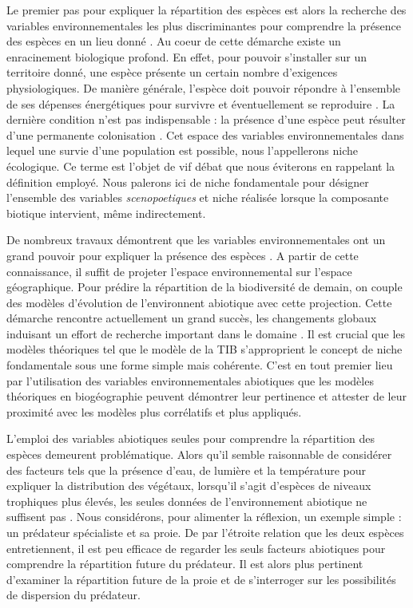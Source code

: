 Le premier pas pour expliquer la répartition des espèces est alors la
recherche des variables environnementales les plus discriminantes pour
comprendre la présence des espèces en un lieu donné \cite{Kearney2004}.
Au coeur de cette démarche existe un enracinement biologique profond. En
effet, pour pouvoir s'installer sur un territoire donné, une espèce
présente un certain nombre d'exigences physiologiques. De manière
générale, l'espèce doit pouvoir répondre à l'ensemble de ses dépenses
énergétiques pour survivre et éventuellement se reproduire
\cite{Holt2009a}. La dernière condition n'est pas indispensable : la
présence d'une espèce peut résulter d'une permanente colonisation
\cite{Leibold2004}. Cet espace des variables environnementales dans
lequel une survie d'une population est possible, nous l'appellerons
niche écologique. Ce terme est l'objet de vif débat \cite{Chase2003} que
nous éviterons en rappelant la définition employé. Nous palerons ici de
niche fondamentale pour désigner l'ensemble des variables
\textit{scenopoetiques} et niche réalisée lorsque la composante biotique
intervient, même indirectement.

De nombreux travaux démontrent que les variables environnementales ont
un grand pouvoir pour expliquer la présence des espèces
\cite{Engelbrecht2007}. A partir de cette connaissance, il suffit de
projeter l'espace environnemental sur l'espace géographique. Pour
prédire la répartition de la biodiversité de demain, on couple des
modèles d'évolution de l'environnent abiotique avec cette projection.
Cette démarche rencontre actuellement un grand succès, les changements
globaux induisant un effort de recherche important dans le domaine
\cite{Thomas2004,Thuiller2011}. Il est crucial que les modèles
théoriques tel que le modèle de la TIB s'approprient le concept de niche
fondamentale sous une forme simple mais cohérente. C'est en tout premier
lieu par l'utilisation des variables environnementales abiotiques que
les modèles théoriques en biogéographie peuvent démontrer leur
pertinence et attester de leur proximité avec les modèles plus
corrélatifs et plus appliqués.

L'emploi des variables abiotiques seules pour comprendre la répartition
des espèces demeurent problématique. Alors qu'il semble raisonnable de
considérer des facteurs tels que la présence d'eau, de lumière et la
température pour expliquer la distribution des végétaux, lorsqu'il
s'agit d'espèces de niveaux trophiques plus élevés, les seules données
de l'environnement abiotique ne suffisent pas
\cite{Gravel2011b,Godsoe2012}. Nous considérons, pour alimenter la
réflexion, un exemple simple : un prédateur spécialiste et sa proie. De
par l'étroite relation que les deux espèces entretiennent, il est peu
efficace de regarder les seuls facteurs abiotiques pour comprendre la
répartition future du prédateur. Il est alors plus pertinent d'examiner
la répartition future de la proie et de s'interroger sur les
possibilités de dispersion du prédateur.

